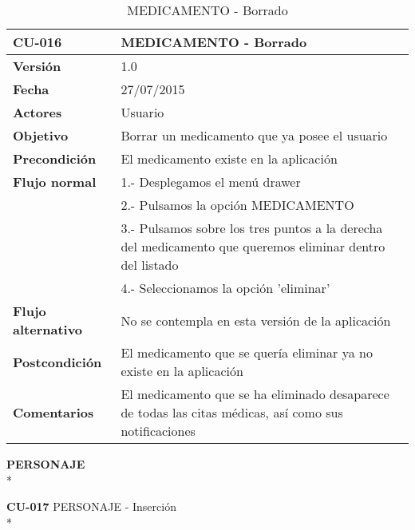\documentclass[../pfc.tex]{subfiles}
\begin{document}
		\begin{table}[H]
			\centering
			\begin{tabular}[t]{|p{3cm}|p{9.5cm}|}
				\hline \textbf{CU-016} & \textbf{MEDICAMENTO - Borrado} \\*
				\hline\hline \textbf{Versión} & 1.0 \\*
				\hline\hline \textbf{Fecha} & 27/07/2015 \\*
				\hline\textbf{Actores} 	& Usuario\\*
				\hline \textbf{Objetivo} & Borrar un medicamento que ya posee el usuario\\* 			
				\hline \textbf{Precondición} & El medicamento existe en la aplicación\\* 
				\hline \textbf{Flujo normal} & 1.- Desplegamos el menú drawer \\* 
				& 2.- Pulsamos la opción MEDICAMENTO\\*	
				& 3.- Pulsamos sobre los tres puntos a la derecha del medicamento que queremos eliminar dentro del listado\\*	
				& 4.- Seleccionamos la opción 'eliminar'\\*	
				\hline \textbf{Flujo alternativo} & No se contempla en esta versión de la aplicación\\* 
				\hline \textbf{Postcondición} & El medicamento que se quería eliminar ya no existe en la aplicación \\* 
				\hline \textbf{Comentarios}   & El medicamento que se ha eliminado desaparece de todas las citas médicas, así como sus notificaciones\\*
				\hline
			\end{tabular}
			\caption{MEDICAMENTO - Borrado}
			\label{tabla:caso016}
		\end{table}
		
		
		
		\textbf{PERSONAJE}\\*
		
		\textbf{CU-017}	PERSONAJE - Inserción\\*
		
\end{document}
